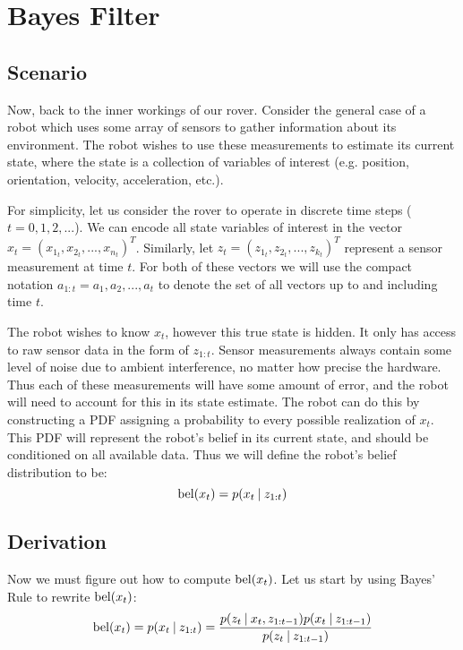 \section{Bayes Filter}
\subsection{Scenario}
Now, back to the inner workings of our rover. Consider the general case of a robot which uses some array of sensors to gather information about its environment. The robot wishes to use these measurements to estimate its current state, where the state is a collection of variables of interest (e.g. position, orientation, velocity, acceleration, etc.).

For simplicity, let us consider the rover to operate in discrete time steps (\(t=0,1,2,...\)). We can encode all state variables of interest in the vector \(x_t = (x_{1_t}, x_{2_t}, ... , x_{n_t})^T\). Similarly, let \(z_t = (z_{1_t}, z_{2_t}, ... , z_{k_t})^T\) represent a sensor measurement at time \(t\). For both of these vectors we will use the compact notation \(a_{1:t} = a_1, a_2, ..., a_t\) to denote the set of all vectors up to and including time \(t\).

The robot wishes to know \(x_t\), however this true state is hidden. It only has access to raw sensor data in the form of \(z_{1:t}\). Sensor measurements always contain some level of noise due to ambient interference, no matter how precise the hardware. Thus each of these measurements will have some amount of error, and the robot will need to account for this in its state estimate. The robot can do this by constructing a PDF assigning a probability to every possible realization of \(x_t\). This PDF will represent the robot's belief in its current state, and should be conditioned on all available data. Thus we will define the robot's belief distribution to be:
\begin{equation} \label{eqBel}
\mathrm{bel}(x_t) = p(x_t \mathbin{\vert} z_{1:t})
\end{equation}

\subsection{Derivation}
Now we must figure out how to compute \(\mathrm{bel}(x_t)\). Let us start by using Bayes' Rule to rewrite \(\mathrm{bel}(x_t)\):
\begin{equation*}
\mathrm{bel}(x_t) = p(x_t \mathbin{\vert} z_{1:t}) = \frac{p(z_t \mathbin{\vert} x_t, z_{1:t-1})p(x_t \mathbin{\vert} z_{1:t-1})}{p(z_t \mathbin{\vert} z_{1:t-1})}
\end{equation*}

